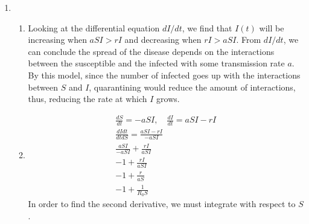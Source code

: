\documentclass[12pt,letterpaper]{article}
\begin{document}
\begin{enumerate}
    \item 
    \begin{enumerate}

        \item Looking at the differential equation $dI/dt$, we find that $I(t)$ will
        be increasing when $aSI > rI$ and decreasing when $rI > aSI$. From $dI/dt$, 
        we can conclude the spread of the disease depends on the interactions between 
        the susceptible and the infected with some transmission rate $a$. By this model, 
        since the number of infected goes up with the interactions between $S$ and $I$, 
        quarantining would reduce the amount of interactions, thus, reducing the 
        rate at which $I$ grows. 
        \item 
        \begin{eqnarray*}
            \frac{dS}{dt} = -a S I, \quad \frac{dI}{dt} = a S I - r I \\
            \frac{dIdt}{dtdS} = \frac{a S I - r I}{-a S I}\\
            \frac{aSI}{-aSI} + \frac{rI}{aSI}\\
            -1 + \frac{rI}{aSI} \\
            -1 + \frac{r}{aS} \\
            -1 + \frac{1}{R_0 S}
        \end{eqnarray*}
        In order to find the second derivative, we must integrate with respect to $S$. 
        \begin{eqnarray*}
            
        \end{eqnarray*}
    \end{enumerate}
\end{enumerate}
\end{document}
